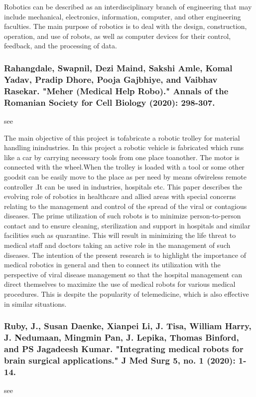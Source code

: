 \documentclass[conference]{IEEEtran}
\begin{document}
Robotics can be described as an interdisciplinary branch of engineering that may include mechanical, electronics, information, computer, and other engineering faculties. The main purpose of robotics is to deal with the design, construction, operation, and use of robots, as well as computer devices for their control, feedback, and the processing of data.

\medskip
\subsubsection{Rahangdale, Swapnil, Dezi Maind, Sakshi Amle, Komal Yadav, Pradip Dhore, Pooja Gajbhiye, and Vaibhav Rasekar. "Meher (Medical Help Robo)." Annals of the Romanian Society for Cell Biology (2020): 298-307.}
see \cite{rahangdale2020meher}

The main objective of this project is tofabricate a robotic trolley for material handling inindustries. In this project a robotic vehicle is fabricated which runs like a car by carrying necessary tools from one place toanother. The motor is connected with the wheel.When the trolley is loaded with a tool or some other goodsit can be easily move to the place as per need by means ofwireless remote controller .It can be used in industries, hospitals etc. This paper describes the evolving role of robotics in healthcare and allied areas with special concerns relating to the management and control of the spread of the viral or contagious diseases.  The prime utilization of such robots is to minimize person-to-person contact and to ensure cleaning, sterilization and support in hospitals and similar facilities such as quarantine. This will result in minimizing the life threat to medical staff and doctors taking an active role in the management of such diseases. The intention of the present research is to highlight the importance of medical robotics in general and then to connect its utilization with the perspective of viral disease management so that the hospital management can direct themselves to maximize the use of medical robots for various medical procedures. This is despite the popularity of telemedicine, which is also effective in similar situations.

\medskip
\subsubsection{Ruby, J., Susan Daenke, Xianpei Li, J. Tisa, William Harry, J. Nedumaan, Mingmin Pan, J. Lepika, Thomas Binford, and PS Jagadeesh Kumar. "Integrating medical robots for brain surgical applications." J Med Surg 5, no. 1 (2020): 1-14.}
see \cite{ruby2020integrating}
\end{document}
